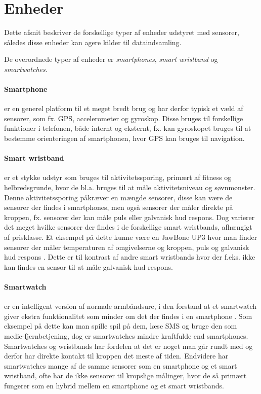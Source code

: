 \section{Enheder}\label{sec:kilder-til-sensorer}
Dette afsnit beskriver de forskellige typer af enheder udstyret med sensorer, således disse enheder kan agere kilder til dataindsamling.

De overordnede typer af enheder er \textit{smartphones}, \textit{smart wristband} og \textit{smartwatches}. 

\paragraph{Smartphone}
er en generel platform til et meget bredt brug og har derfor typisk et væld af sensorer, som fx. GPS, accelerometer og gyroskop.
Disse bruges til forskellige funktioner i telefonen, både internt og eksternt, fx. kan gyroskopet bruges til at bestemme orienteringen af smartphonen, hvor GPS kan bruges til navigation.

\paragraph{Smart wristband} %
er et stykke udstyr som bruges til aktivitetssporing, primært af fitness og helbredsgrunde, hvor de bl.a. bruges til at måle aktivitetsniveau og søvnmønster.
Denne aktivitetssporing påkræver en mængde sensorer, disse kan være de sensorer der findes i smartphones, men også sensorer der måler direkte på kroppen, fx. sensorer der kan måle puls eller galvanisk hud respons. 
Dog varierer det meget hvilke sensorer der findes i de forskellige smart wristbands, afhængigt af prisklasse.
Et eksempel på dette kunne være en JawBone UP3 hvor man finder sensorer der måler temperaturen af omgivelserne og kroppen, puls og galvanisk hud respons \citep{misc:jawboneup3sensors}. 
Dette er til kontrast af andre smart wristbands hvor der f.eks. ikke kan findes en sensor til at måle galvanisk hud respons.

\paragraph{Smartwatch}
er en intelligent version af normale armbåndsure, i den forstand at et smartwatch giver ekstra funktionalitet som minder om det der findes i en smartphone \citep{msic:smartwatchstate}. 
Som eksempel på dette kan man spille spil på dem, læse SMS og bruge den som medie-fjernbetjening, dog er smartwatches mindre kraftfulde end smartphones. 
Smartwatches og wristbands har fordelen at det er noget man går rundt med og derfor har direkte kontakt til kroppen det meste af tiden.
Endvidere har smartwatches mange af de samme sensorer som en smartphone og et smart wristband, ofte har de ikke sensorer til kropslige målinger, hvor de så primært fungerer som en hybrid mellem en smartphone og et smart wristbands.

